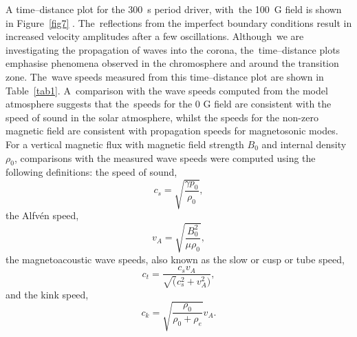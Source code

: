 \documentclass[physics,article,accept,pdftex,moreauthors]{Definitions/mdpi}
\begin{document}
A  time--distance plot for the 300~s period driver, with~the 
 {100~G} %
field is shown in {Figure~\ref{fig7}}%
. The~reflections from the imperfect boundary conditions result in increased velocity amplitudes after a few oscillations. Although~we are investigating the propagation of waves into the corona, the~time--distance plots emphasise phenomena observed in the chromosphere and around the transition zone.  The~wave speeds measured from this time--distance plot are shown in Table~\ref{tab1}. A~comparison with the wave speeds computed from the model atmosphere suggests that the~speeds for the 0 G field are consistent with the speed of sound in the solar atmosphere, whilst the speeds for the non-zero magnetic field are consistent with propagation speeds for magnetosonic modes.
For a  vertical magnetic flux %
with magnetic field strength $B_{0}$ and internal density $\rho_{0}$, comparisons with the measured wave speeds were computed using the following definitions:
the speed of sound,
\begin{equation}
 c_{s}  =    \sqrt{\frac{\gamma p_0}{\rho_0}}, 
\label{e10}
\end{equation}
the Alfv\'en speed,
\begin{equation}
 v_{A}  =    \sqrt{\frac{B_{0}^{2}}{\mu\rho_{0}}},  
\label{e11}
\end{equation}
the magnetoacoustic wave speeds, also known as  the slow or cusp or tube speed,
\begin{equation}
 c_{t}  =    \frac{c_s v_A}{\sqrt(c_s^2+v_A^2)}, 
\label{e12}
\end{equation}
and the kink speed,
\begin{equation}
 c_{k}  =    \sqrt{\frac{\rho_0}{\rho_0+\rho_e}}v_A.
\label{e12}
\end{equation}
\end{document}
